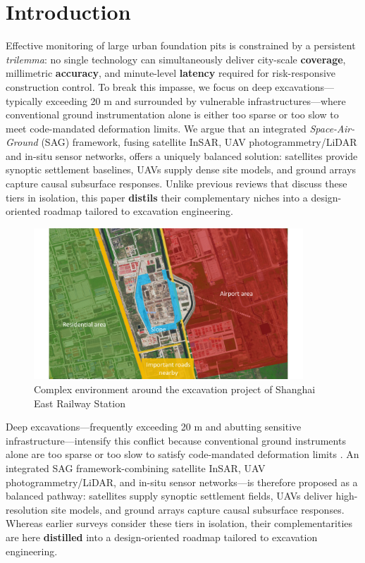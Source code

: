 \documentclass[preprint,11pt,authoryear,3p]{elsarticle}
\begin{document}
\section{Introduction}

Effective monitoring of large urban foundation pits is constrained by a persistent \emph{trilemma}: no single technology can simultaneously deliver city-scale \textbf{coverage}, millimetric \textbf{accuracy}, and minute-level \textbf{latency} required for risk-responsive construction control\citep{gong2019advances}. To break this impasse, we focus on deep excavations—typically exceeding 20 m and surrounded by vulnerable infrastructures—where conventional ground instrumentation alone is either too sparse or too slow to meet code-mandated deformation limits.  We argue that an integrated \emph{Space-Air-Ground} (SAG) framework, fusing satellite InSAR, UAV photogrammetry/LiDAR and in-situ sensor networks, offers a uniquely balanced solution: satellites provide synoptic settlement baselines, UAVs supply dense site models, and ground arrays capture causal subsurface responses.  Unlike previous reviews that discuss these tiers in isolation, this paper \textbf{distils} their complementary niches into a design-oriented roadmap tailored to excavation engineering.

\begin{figure}
    \centering
    \includegraphics[width=0.9\textwidth]{imgs/Multi_chars.pdf}
    \caption{Complex environment around the excavation project of Shanghai East Railway Station}
    \label{fig:complexEnvironment}
\end{figure}

Deep excavations—frequently exceeding 20 m and abutting sensitive infrastructure—intensify this conflict because conventional ground instruments alone are too sparse or too slow to satisfy code-mandated deformation limits \citep{AnIntegratedIntelligent}. An integrated SAG framework-combining satellite InSAR, UAV photogrammetry/LiDAR, and in-situ sensor networks—is therefore proposed as a balanced pathway: satellites supply synoptic settlement fields, UAVs deliver high-resolution site models, and ground arrays capture causal subsurface responses. Whereas earlier surveys consider these tiers in isolation, their complementarities are here \textbf{distilled} into a design-oriented roadmap tailored to excavation engineering.
\end{document}
